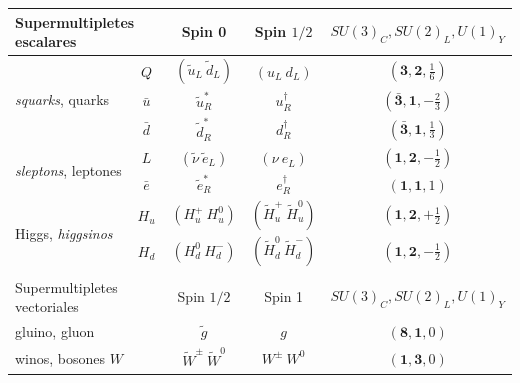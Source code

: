 \begin{table} 

	\centering

	\begin{tabular}{ l c | c c c}

		\multicolumn{2}{l|}{Supermultipletes escalares} & Spin 0 & Spin $1/2$ & $SU(3)_C, SU(2)_L, U(1)_Y$ \\

		\hline

		\multirow{3}{*}{\textit{squarks}, quarks} & $Q$ & $(\tilde{u}_L\ \tilde{d}_L)$ & $(u_L\ d_L)$ & $(\textbf{3}, \textbf{2}, \frac{1}{6})$ \\
		 & $\bar{u}$ & $\tilde{u}_R^*$ & $u_R^{\dagger}$ & $(\bar{\textbf{3}}, \textbf{1}, -\frac{2}{3})$ \\
		 & $\bar{d}$ & $\tilde{d}_R^*$ & $d_R^{\dagger}$ & $(\bar{\textbf{3}}, \textbf{1}, \frac{1}{3})$ \\

		\hline

		\multirow{2}{*}{\textit{sleptons}, leptones} & $L$ & $(\tilde{\nu}\ \tilde{e}_L)$ & $(\nu\ e_L)$ & $(\textbf{1}, \textbf{2}, -\frac{1}{2})$ \\
		 & $\bar{e}$ & $\tilde{e}_R^*$ & $e_R^{\dagger}$ & $(\textbf{1}, \textbf{1}, 1)$ \\

		\hline

		\multirow{2}{*}{Higgs, \textit{higgsinos}} & $H_u$ & $(H_u^+\ H_u^0)$ & $(\widetilde{H}_u^+\ \widetilde{H}_u^0)$ & $(\textbf{1}, \textbf{2}, +\frac{1}{2})$ \\
		 & $H_d$ & $(H_d^0\ H_d^-)$ & $(\widetilde{H}_d^0\ \widetilde{H}_d^-)$ & $(\textbf{1}, \textbf{2}, -\frac{1}{2})$ \\

		\multicolumn{5}{c}{} \\

		\hline

		\multicolumn{2}{l|}{Supermultipletes vectoriales} & Spin $1/2$ & Spin 1 & $SU(3)_C, SU(2)_L, U(1)_Y$ \\

		\hline

		\multicolumn{2}{l|}{gluino, gluon} & $\tilde{g}$ & $g$ & $(\textbf{8}, \textbf{1}, 0)$ \\

		\hline

		\multicolumn{2}{l|}{winos, bosones $W$} & $\widetilde{W}^{\pm}\ \widetilde{W}^{0}$ & $W^{\pm}\ W^0$ & $(\textbf{1}, \textbf{3}, 0)$ \\


\end{tabular}
\end{table}

